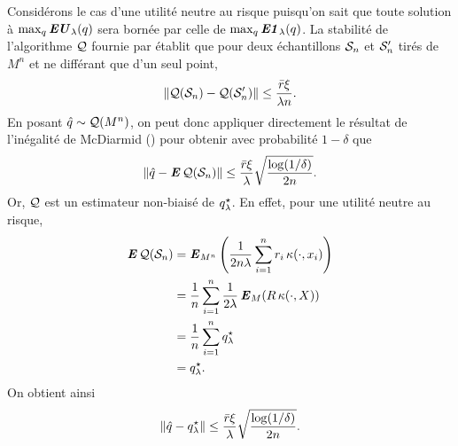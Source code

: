 \begin{lemme}
  \label{b:lem:qhnorm}
  Considérons le cas d'une utilité neutre au risque puisqu'on sait que toute solution à
  $\max_q\EU_\lambda(q)$ sera bornée par celle de $\max_q\EN_\lambda(q)$.  La stabilité de
  l'algorithme $\alg$ fournie par \cite{bousquet2002stability} établit que pour deux
  échantillons $\S_n$ et $\S_n'$ tirés de $M^n$ et ne différant que d'un seul point,
  \begin{equation}
    \|\alg(\S_n) - \alg(\S'_n)\| \leq \frac{\rmax\xi}{\lambda n}.
  \end{equation}
  En posant $\qh \sim \alg(M^n)$, on peut donc appliquer directement le résultat de
  l'inégalité de McDiarmid () pour obtenir avec probabilité
  $1-\delta$ que
  \begin{equation}
    \|\qh - \E\alg(\S_n)\| \leq \frac{\rmax\xi}{\lambda}\sqrt{\frac{\log(1/\delta)}{2n}}.
  \end{equation}
  Or, $\alg$ est un estimateur non-biaisé de $\qsl$. En effet, pour une utilité neutre au
  risque,
  \begin{align}
    \E\alg(\S_n) &= \E_{M^n}\left(\frac{1}{2n\lambda}\sumi r_i\,\kappa(\cdot,x_i)\right)\\
                 & =\frac{1}{n}\sumi \frac{1}{2\lambda}\E_M(R\,\kappa(\cdot,X))\\
                 & =\frac{1}{n}\sumi \qsl\\
                 &=\qsl.
  \end{align}
  On obtient ainsi
  \begin{equation}
    \|\qh - \qsl\| \leq \frac{\rmax\xi}{\lambda}\sqrt{\frac{\log(1/\delta)}{2n}}.
  \end{equation}
\end{lemme}





